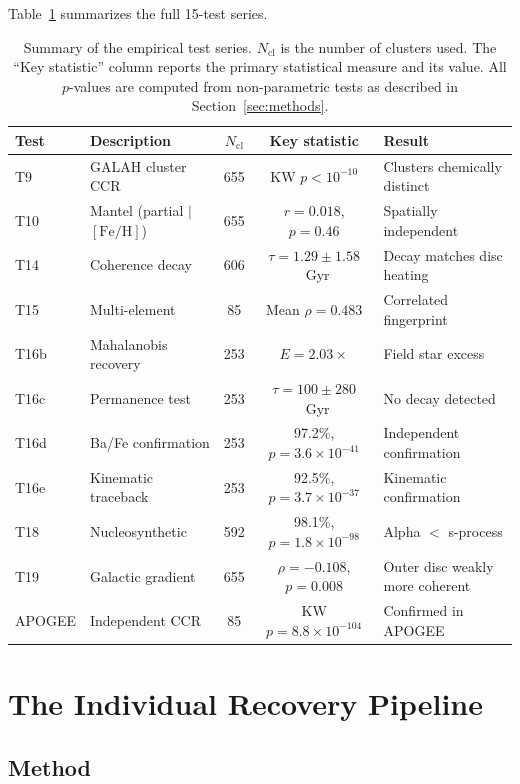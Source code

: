 \documentclass[fleqn,usenatbib]{mnras}
\newcommand{\feh}{$\mathrm{[Fe/H]}$\xspace}
\begin{document}
Table~\ref{tab:summary} summarizes the full 15-test series.

\begin{table}
\centering
\caption{Summary of the empirical test series. $N_{\mathrm{cl}}$ is the number of clusters used. The ``Key statistic'' column reports the primary statistical measure and its value. All $p$-values are computed from non-parametric tests as described in Section~\ref{sec:methods}.}
\label{tab:summary}
\begin{tabular}{llccl}
\toprule
Test & Description & $N_{\mathrm{cl}}$ & Key statistic & Result \\
\midrule
T9  & GALAH cluster CCR    & 655 & KW $p < 10^{-10}$                 & Clusters chemically distinct \\
T10 & Mantel (partial $\mid$\,\feh) & 655 & $r = 0.018$, $p = 0.46$ & Spatially independent \\
T14 & Coherence decay      & 606 & $\tau = 1.29 \pm 1.58$~Gyr         & Decay matches disc heating \\
T15 & Multi-element        &  85 & Mean $\rho = 0.483$                & Correlated fingerprint \\
T16b & Mahalanobis recovery & 253 & $E = 2.03\times$                  & Field star excess \\
T16c & Permanence test      & 253 & $\tau = 100 \pm 280$~Gyr           & No decay detected \\
T16d & Ba/Fe confirmation   & 253 & 97.2\%, $p = 3.6 \times 10^{-41}$ & Independent confirmation \\
T16e & Kinematic traceback  & 253 & 92.5\%, $p = 3.7 \times 10^{-37}$ & Kinematic confirmation \\
T18 & Nucleosynthetic      & 592 & 98.1\%, $p = 1.8 \times 10^{-98}$ & Alpha $<$ s-process \\
T19 & Galactic gradient    & 655 & $\rho = -0.108$, $p = 0.008$ & Outer disc weakly more coherent \\
APOGEE & Independent CCR   &  85 & KW $p = 8.8 \times 10^{-104}$     & Confirmed in APOGEE \\
\bottomrule
\end{tabular}
\end{table}


\section{The Individual Recovery Pipeline}
\label{sec:pipeline}

\subsection{Method}
\end{document}
